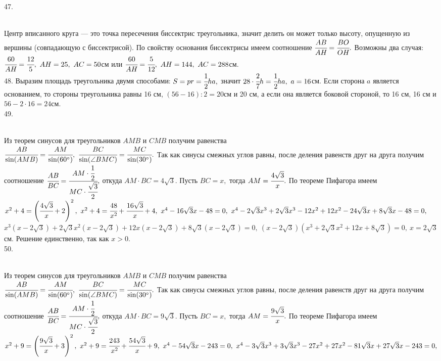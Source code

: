 47. \begin{figure}[ht!]
\end{figure}\\
Центр вписанного круга --- это точка пересечения биссектрис треугольника, значит делить он может только высоту, опущенную из вершины (совпадающую с биссектрисой). По свойству основания биссектрисы имеем соотношение $\cfrac{AB}{AH}=\cfrac{BO}{OH}.$ Возможны два случая: $\cfrac{60}{AH}=\cfrac{12}{5},\ AH=25,\ AC=50$см или
$\cfrac{60}{AH}=\cfrac{5}{12},\ AH=144,\ AC=288$см.\\
48. Выразим площадь треугольника двумя способами: $S=pr=\cfrac{1}{2}ha,$ значит $28\cdot\cfrac{2}{7}h=\cfrac{1}{2}ha,\ a=16$см. Если сторона $a$ является основанием, то стороны треугольника равны 16 см, $(56-16):2=20$см и 20 см, а если она является боковой стороной, то 16 см, 16 см и $56-2\cdot16=24$см.\\
49. \begin{figure}[ht!]
\end{figure}\\
Из теорем синусов для треугольников $AMB$ и $CMB$ получим равенства\\ $\cfrac{AB}{\sin(AMB)}=\cfrac{AM}{\sin(60^\circ)},\ \cfrac{BC}{\sin(\angle BMC)}= \cfrac{MC}{\sin(30^\circ)}.$ Так как синусы смежных углов равны, после деления равенств друг на друга получим соотношение $\cfrac{AB}{BC}=\cfrac{AM\cdot\cfrac{1}{2}}{MC\cdot\cfrac{\sqrt{3}}{2}},$ откуда $AM\cdot BC=4\sqrt{3}.$ Пусть $BC=x,$ тогда $AM=\cfrac{4\sqrt{3}}{x}.$ По теореме Пифагора имеем $x^2+4=\left(\cfrac{4\sqrt{3}}{x}+2\right)^2,\ x^2+4=\cfrac{48}{x^2}+\cfrac{16\sqrt{3}}{x}+4,\ x^4-16\sqrt{3}x-48=0,\ x^4-2\sqrt{3}x^3+2\sqrt{3}x^3-12x^2+12x^2-24\sqrt{3}x+8\sqrt{3}x-48=0,$\\
$x^3(x-2\sqrt{3})+2\sqrt{3}x^2(x-2\sqrt{3})+12x(x-2\sqrt{3})+8\sqrt{3}(x-2\sqrt{3})=0,\ (x-2\sqrt{3})(x^3+2\sqrt{3}x^2+12x+8\sqrt{3})=0,\ x=2\sqrt{3}$см. Решение единственно, так как $x>0.$\\
50. \begin{figure}[ht!]
\end{figure}\\
Из теорем синусов для треугольников $AMB$ и $CMB$ получим равенства\\ $\cfrac{AB}{\sin(AMB)}=\cfrac{AM}{\sin(60^\circ)},\ \cfrac{BC}{\sin(\angle BMC)}= \cfrac{MC}{\sin(30^\circ)}.$ Так как синусы смежных углов равны, после деления равенств друг на друга получим соотношение $\cfrac{AB}{BC}=\cfrac{AM\cdot\cfrac{1}{2}}{MC\cdot\cfrac{\sqrt{3}}{2}},$ откуда $AM\cdot BC=9\sqrt{3}.$ Пусть $BC=x,$ тогда $AM=\cfrac{9\sqrt{3}}{x}.$ По теореме Пифагора имеем $x^2+9=\left(\cfrac{9\sqrt{3}}{x}+3\right)^2,\ x^2+9=\cfrac{243}{x^2}+\cfrac{54\sqrt{3}}{x}+9,\ x^4-54\sqrt{3}x-243=0,\ x^4-3\sqrt{3}x^3+3\sqrt{3}x^3-27x^2+27x^2-81\sqrt{3}x+27\sqrt{3}x-243=0,$\\
